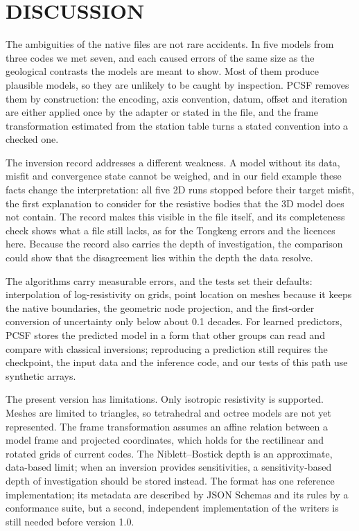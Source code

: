 \documentclass[manuscript]{geophysics}
\begin{document}
\section{DISCUSSION}

The ambiguities of the native files are not rare accidents. In five
models from three codes we met seven, and each caused errors of the
same size as the geological contrasts the models are meant to show.
Most of them produce plausible models, so they are unlikely to be
caught by inspection. PCSF removes them by construction: the encoding,
axis convention, datum, offset and iteration are either applied once
by the adapter or stated in the file, and the frame transformation
estimated from the station table turns a stated convention into a
checked one.

The inversion record addresses a different weakness. A model without
its data, misfit and convergence state cannot be weighed, and in our
field example these facts change the interpretation: all five 2D runs
stopped before their target misfit, the first explanation to
consider for the resistive bodies that the 3D model does not contain.
The record makes this visible in the file itself, and its completeness
check shows what a file still lacks, as for the Tongkeng errors and the
licences here. Because the record also carries the depth of
investigation, the comparison could show that the disagreement lies
within the depth the data resolve.

The algorithms carry measurable errors, and the tests set their
defaults: interpolation of log-resistivity on grids, point location on
meshes because it keeps the native boundaries, the geometric node
projection, and the first-order conversion of uncertainty only below
about 0.1 decades. For learned predictors, PCSF
stores the predicted model in a form that other groups can read and
compare with classical inversions; reproducing a prediction still
requires the checkpoint, the input data and the inference code, and
our tests of this path use synthetic arrays.

The present version has limitations. Only isotropic resistivity is
supported. Meshes are limited to triangles, so tetrahedral and octree
models are not yet represented. The frame transformation assumes an
affine relation between a model frame and projected coordinates, which
holds for the rectilinear and rotated grids of current codes. The
Niblett--Bostick depth is an approximate, data-based limit; when an
inversion provides sensitivities, a sensitivity-based depth of
investigation should be stored instead. The format has one reference
implementation; its metadata are described by JSON Schemas and its
rules by a conformance suite, but a second, independent
implementation of the writers is still needed before version 1.0.
\end{document}
